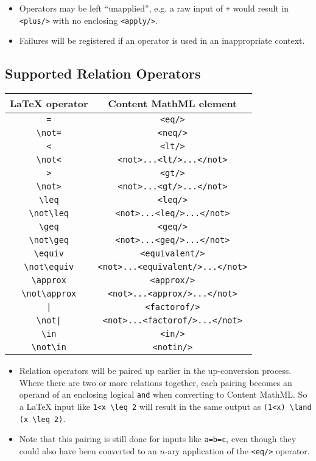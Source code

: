 \begin{itemize}
\item
Operators may be left ``unapplied'', e.g. a raw input of \verb|+|
would result in \verb|<plus/>| with no enclosing
\verb|<apply/>|.

\item
Failures will be registered if an operator is used in an inappropriate
context.
\end{itemize}

\subsection*{Supported Relation Operators}

\begin{tabular}{|c|c|}
\hline
LaTeX operator & Content MathML element \\
\hline
\verb|=| & \verb|<eq/>| \\
\verb|\not=| & \verb|<neq/>| \\
\verb|<| & \verb|<lt/>| \\
\verb|\not<| & \verb|<not>...<lt/>...</not>| \\
\verb|>| & \verb|<gt/>| \\
\verb|\not>| & \verb|<not>...<gt/>...</not>| \\
\verb|\leq| & \verb|<leq/>| \\
\verb|\not\leq| & \verb|<not>...<leq/>...</not>| \\
\verb|\geq| & \verb|<geq/>| \\
\verb|\not\geq| & \verb|<not>...<geq/>...</not>| \\
\verb|\equiv| & \verb|<equivalent/>| \\
\verb|\not\equiv| & \verb|<not>...<equivalent/>...</not>| \\
\verb|\approx| & \verb|<approx/>| \\
\verb|\not\approx| & \verb|<not>...<approx/>...</not>| \\
\verb.|. & \verb|<factorof/>| \\
\verb.\not|. & \verb|<not>...<factorof/>...</not>| \\
\verb|\in| & \verb|<in/>| \\
\verb|\not\in| & \verb|<notin/>| \\
\hline
\end{tabular}

\begin{itemize}
\item
  Relation operators will be paired up earlier in the up-conversion
  process. Where there are two or more relations together, each pairing
  becomes an operand of an enclosing logical \verb|and| when
  converting to Content MathML. So a LaTeX input like \verb|1<x \leq 2| will
  result in the same output as \verb|(1<x) \land (x \leq 2)|.

\item
  Note that this pairing is still done for inputs like \verb|a=b=c|,
  even though they could also have been converted to an $n$-ary application of
  the \verb|<eq/>| operator.
\end{itemize}

